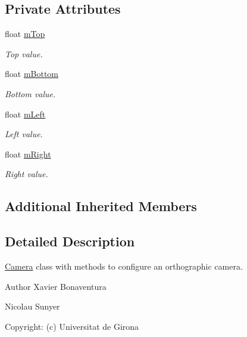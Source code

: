 \subsection*{Private Attributes}
\begin{DoxyCompactItemize}
\item 
float \hyperlink{class_orthographic_camera_adb391b0b57fa70a2eaadd661f8ab423d}{m\+Top}
\begin{DoxyCompactList}\small\item\em Top value. \end{DoxyCompactList}\item 
float \hyperlink{class_orthographic_camera_aa901bf30589a77235d3b583d7a549ea0}{m\+Bottom}
\begin{DoxyCompactList}\small\item\em Bottom value. \end{DoxyCompactList}\item 
float \hyperlink{class_orthographic_camera_a9a1ad18a4b2b39b4d3f7f09f53817d54}{m\+Left}
\begin{DoxyCompactList}\small\item\em Left value. \end{DoxyCompactList}\item 
float \hyperlink{class_orthographic_camera_a8ece912d753235b6f79f1607a19f892b}{m\+Right}
\begin{DoxyCompactList}\small\item\em Right value. \end{DoxyCompactList}\end{DoxyCompactItemize}
\subsection*{Additional Inherited Members}


\subsection{Detailed Description}
\hyperlink{class_camera}{Camera} class with methods to configure an orthographic camera. 

\begin{DoxyAuthor}{Author}
Xavier Bonaventura 

Nicolau Sunyer 

Copyright\+: (c) Universitat de Girona 
\end{DoxyAuthor}



